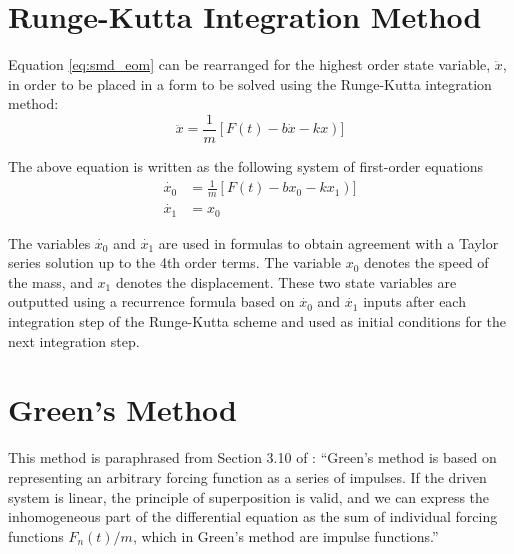 \documentclass[10pt,letterpaper]{article}
\begin{document}
\section{Runge-Kutta Integration Method}
Equation \ref{eq:smd_eom} can be rearranged for the highest order state variable, $\ddot{x}$, in order to be placed in a form to be solved using the Runge-Kutta integration method:
\begin{equation}
	\ddot{x} = \frac{1}{m}\left[ F(t) - b\dot{x} - kx \right)]
\end{equation}

The above equation is written as the following system of first-order equations
\begin{align}
	\dot{x_0} &= \frac{1}{m}\left[ F(t) - bx_0 - kx_1 \right)] \\
	\dot{x_1} &= x_0
\end{align}

The variables $\dot{x_0}$ and $\dot{x_1}$ are used in formulas to obtain agreement with a Taylor series solution up to the 4th order terms.
The variable $x_0$ denotes the speed of the mass, and $x_1$ denotes the displacement.
These two state variables are outputted using a recurrence formula based on $\dot{x_0}$ and $\dot{x_1}$ inputs after each integration step of the Runge-Kutta scheme and used as initial conditions for the next integration step.

\section{Green's Method}
This method is paraphrased from Section 3.10 of \citet{marion95.1}:
``Green's method is based on representing an arbitrary forcing function as a series of impulses.
If the driven system is linear, the principle of superposition is valid, and we can express the inhomogeneous part of the differential equation as the sum of individual forcing functions $F_n(t)/m$, which in Green's method are impulse functions.''
\end{document}
